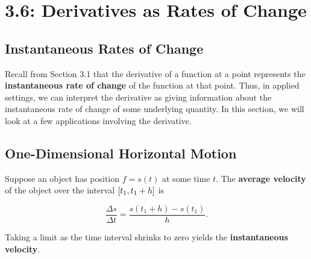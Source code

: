 \documentclass[12pt]{article}
\begin{document}
\section*{3.6: Derivatives as Rates of Change}


\vspace{5mm}

\subsection*{Instantaneous Rates of Change}

Recall from Section 3.1 that the derivative of a function at a point represents the \textbf{instantaneous rate of change} of the function at that point. Thus, in applied settings, we can interpret the derivative as giving information about the instantaneous rate of change of some underlying quantity. In this section, we will look at a few applications involving the derivative.

\subsection*{One-Dimensional Horizontal Motion}

Suppose an object has position $f=s(t)$ at some time $t$. The \textbf{average velocity} of the object over the interval $\left[ t_1, t_1+h\right]$ is

$$\frac{\Delta s}{\Delta t}=\frac{s(t_1+h)-s(t_1)}{h}.$$

\vspace{3mm}

Taking a limit as the time interval shrinks to zero yields the \textbf{instantaneous velocity}.
\end{document}
